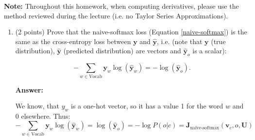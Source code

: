 \documentclass{article}
\newenvironment{answer}{
    {\bf Answer:} \sf \begingroup\color{black}
}{\endgroup}%
\begin{document}
\textbf{Note:} Throughout this homework, when computing derivatives, please use the method reviewed during the lecture (i.e. no Taylor Series Approximations).

\clearpage 
\begin{enumerate}[label=(\alph*)]
\item (2 points) 
Prove that the naive-softmax loss (Equation \ref{naive-softmax}) is the same as the cross-entropy loss between $\bm y$  and $\hat{\bm y}$, i.e. (note that $\bm y$ 
 (true distribution), $\hat{\bm y}$ (predicted distribution) are vectors and $\hat{\bm y}_o$ is a scalar):

\begin{equation} 
-\sum_{w \in \text{Vocab}} \bm y_w \log(\hat{\bm y}_w) = - \log (\hat{\bm y}_o).
\end{equation}

\begin{shaded}
\begin{answer}

We know, that $y_w$ is a one-hot vector, so it has a value 1 for the word $w$ and 0 elsewhere. Thus:
$$
-\sum_{w \in \text{Vocab}} \bm y_w \log(\hat{\bm y}_w) = \log (\hat{\bm y}_o) = - \log P(o|c) = \bm J_{\text{naive-softmax}}(\bm v_c, o, \bm U) 
$$

\end{answer}
\end{shaded}



\end{enumerate}
\end{document}
